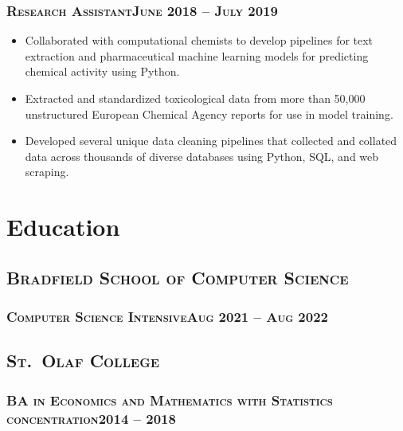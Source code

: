 \documentclass{article}
\newcommand{\resumeSection}[1]{\section*{#1}}
\newcommand{\institution}[1]{\subsection*{\scshape{#1}}}
\newcommand{\jobPosition}[3]{\subsubsection*{\scshape{#1}\hfill #2 -- #3}}
\begin{document}
    \jobPosition{Research Assistant}{June 2018}{July 2019}
    \begin{itemize}[noitemsep]
      \item
            Collaborated with computational chemists to develop
            pipelines for text extraction and pharmaceutical machine
            learning models for predicting chemical activity using Python.
      \item
            Extracted and standardized toxicological data from more
            than 50,000 unstructured European Chemical Agency reports
            for use in model training.
      \item
            Developed several unique data cleaning pipelines that
            collected and collated data across thousands of diverse
            databases using Python, SQL, and web scraping.
    \end{itemize}

\resumeSection{Education}
  \institution{Bradfield School of Computer Science}
    \jobPosition{Computer Science Intensive}{Aug 2021}{Aug 2022}


  \institution{St.\ Olaf College}
    \jobPosition{BA in Economics and Mathematics with Statistics concentration}{2014}{2018}
\end{document}
